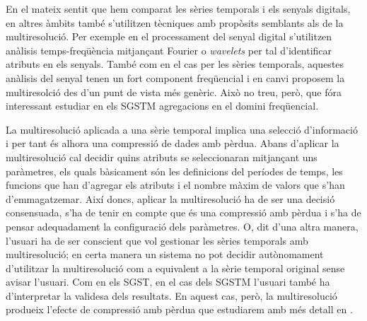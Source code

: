 En el mateix sentit que hem comparat les sèries temporals i els
senyals digitals, en altres àmbits també s'utilitzen tècniques amb
propòsits semblants als de la multiresolució.  Per exemple en el
processament del senyal digital s'utilitzen anàlisis temps-freqüència
mitjançant Fourier o \emph{wavelets} per tal d'identificar atributs en
els senyals. També com en el cas per les sèries temporals, aquestes
anàlisis del senyal tenen un fort component freqüencial i en canvi
proposem la multiresolció des d'un punt de vista més genèric.  Això no
treu, però, que fóra interessant estudiar en els \gls{SGSTM}
agregacions en el domini freqüencial.





La multiresolució aplicada a una sèrie temporal implica una selecció
d'informació i per tant és alhora una compressió de dades amb
pèrdua. Abans d'aplicar la multiresolució cal decidir quins atributs
se seleccionaran mitjançant uns paràmetres, els quals bàsicament són les
definicions del períodes de temps, les funcions que han d'agregar els atributs
i el nombre màxim de valors que s'han d'emmagatzemar.  Així doncs,
aplicar la multiresolució ha de ser una decisió consensuada, s'ha de
tenir en compte que és una compressió amb pèrdua i s'ha de pensar
adequadament la configuració dels paràmetres. O, dit d'una altra
manera, l'usuari ha de ser conscient que vol gestionar les sèries
temporals amb multiresolució; en certa manera un sistema no pot
decidir autònomament d'utilitzar la multiresolució com a equivalent a
la sèrie temporal original sense avisar l'usuari.
%
Com en els \gls{SGST}, en el cas dels \gls{SGSTM} l'usuari també ha
d'interpretar la validesa dels resultats. En aquest cas, però, la
multiresolució produeix l'efecte de compressió amb pèrdua que
estudiarem amb més detall en
.



